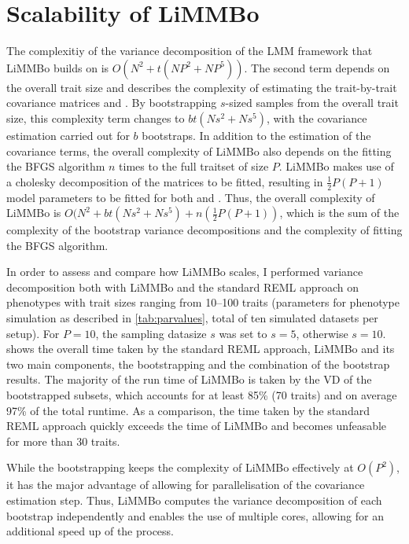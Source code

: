 \section{Scalability of LiMMBo}
\label{section:scalability-limmbo}
The complexitiy of the variance decomposition of the LMM framework that LiMMBo builds on is \(O(N^2 + t(NP^2 + NP^5))\). The second term depends on the overall trait size and describes the complexity of estimating the trait-by-trait covariance matrices   and  . By bootstrapping \(s\)-sized samples from the overall trait size, this complexity term changes to \(bt(Ns^2 + Ns^5)\), with the covariance estimation carried out for \(b\) bootstraps. In addition to the estimation of the covariance terms, the overall complexity of LiMMBo also depends on the fitting the BFGS algorithm \(n\) times to the full traitset of size \(P\). LiMMBo makes use of a cholesky decomposition of the matrices to be fitted, resulting in $\frac{1}{2}P(P+1)$ model parameters to be fitted for both   and  . Thus, the overall complexity of LiMMBo is \(O(N^2 + bt(Ns^2 + Ns^5) + n(\frac{1}{2}P(P+1))\), which is the sum of the complexity of the bootstrap variance decompositions and the complexity of fitting the BFGS algorithm.  

In order to assess and compare how LiMMBo scales, I performed variance decomposition both with LiMMBo and the standard REML approach on phenotypes with trait sizes ranging from \numrange{10}{100} traits (parameters for phenotype simulation as described in \cref{tab:parvalues}, total of ten simulated datasets per setup). For \(P=10\), the sampling datasize \(s\) was set to \(s=5\), otherwise  \(s=10\).   shows the overall time taken by the standard REML approach, LiMMBo and its two main components, the bootstrapping and the combination of the bootstrap results. The majority of the run time of LiMMBo is taken by the VD of the bootstrapped subsets, which accounts for at least \num{85}\%  (\num{70} traits) and on average \num{97}\%  of the total runtime. As a comparison, the time taken by the standard REML approach quickly exceeds the time of LiMMBo and becomes unfeasable for more than \num{30} traits. 

While the bootstrapping keeps the complexity of LiMMBo effectively at \(O(P^2)\), it has the major advantage of allowing for parallelisation of the covariance estimation step. Thus, LiMMBo computes the variance decomposition of each bootstrap independently and enables the use of multiple cores, allowing for an additional speed up of the process. 


